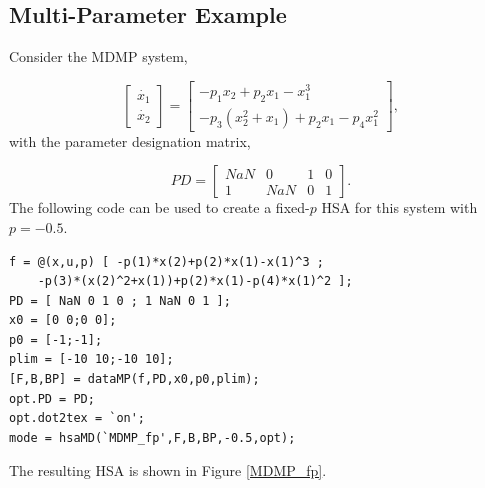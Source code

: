\documentclass[12pt]{article}
\begin{document}
\subsection{Multi-Parameter Example}
Consider the MDMP system,

\begin{equation}
\begin{bmatrix} \dot{x_1} \\ \dot{x_2}
\end{bmatrix}
=
\begin{bmatrix}
-p_1x_2+p_2x_1-x_1^3 \\
-p_3\left(x_2^2+x_1\right)+p_2x_1-p_4x_1^2
\end{bmatrix},
\end{equation}
with the parameter designation matrix, 

\begin{equation}
PD=\begin{bmatrix}
    NaN & 0 & 1 & 0\\
    1 & NaN & 0 & 1
\end{bmatrix}.
\end{equation}
The following code can be used to create a fixed-$p$ HSA for this system with $p=-0.5$.

\begin{addmargin}[0.5in]{1em}
\begin{lstlisting}
f = @(x,u,p) [ -p(1)*x(2)+p(2)*x(1)-x(1)^3 ;
	-p(3)*(x(2)^2+x(1))+p(2)*x(1)-p(4)*x(1)^2 ];
PD = [ NaN 0 1 0 ; 1 NaN 0 1 ];
x0 = [0 0;0 0];
p0 = [-1;-1];
plim = [-10 10;-10 10];
[F,B,BP] = dataMP(f,PD,x0,p0,plim);  
opt.PD = PD;
opt.dot2tex = `on';
mode = hsaMD(`MDMP_fp',F,B,BP,-0.5,opt);   
\end{lstlisting}
\end{addmargin}

\noindent The resulting HSA is shown in Figure \ref{MDMP_fp}.
\end{document}
